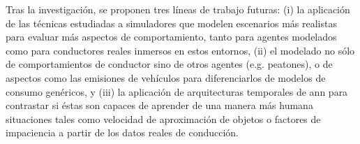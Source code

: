 \begin{fullwidth}
	Tras la investigación, se proponen tres líneas de trabajo futuras: (i) la aplicación de las técnicas estudiadas a simuladores que modelen escenarios más realistas para evaluar más aspectos de comportamiento, tanto para agentes modelados como para conductores reales inmersos en estos entornos, (ii) el modelado no sólo de comportamientos de conductor sino de otros agentes (e.g. peatones), o de aspectos como las emisiones de vehículos para diferenciarlos de modelos de consumo genéricos, y (iii) la aplicación de arquitecturas temporales de \ac{ann} para contrastar si éstas son capaces de aprender de una manera más humana situaciones tales como velocidad de aproximación de objetos o factores de impaciencia  a partir de los datos reales de conducción.
\end{fullwidth}